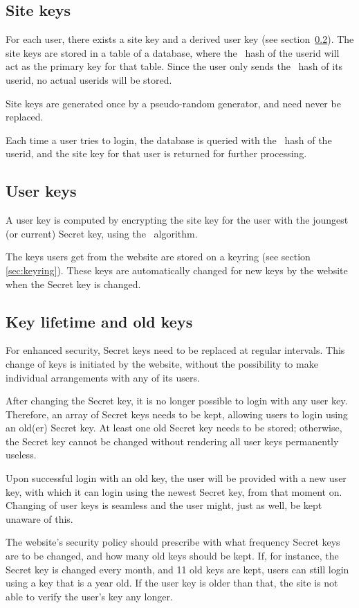 \subsection{Site keys}
For each user, there exists a site key and a derived user key (see section~\ref{sec:userkeys}).
The site keys are stored in a table of a database,
where the \SHA\ hash of the userid will act as the primary key for that table.
Since the user only sends the \SHA\ hash of its userid, no actual userids will be stored.
\par
Site keys are generated once by a pseudo-random generator, and need never be replaced.
\par
Each time a user tries to login,
the database is queried with the \SHA\ hash of the userid,
and the site key for that user is returned for further processing.

\subsection{User keys}
\label{sec:userkeys}
A user key is computed by encrypting the site key for the user with the joungest (or current) Secret key,
using the \AES\ algorithm.
\par
The keys users get from the website are stored on a keyring (see section \ref{sec:keyring}).
These keys are automatically changed for new keys by the website when the Secret key is changed.

\subsection{Key lifetime and old keys}
For enhanced security, Secret keys need to be replaced at regular intervals.
This change of keys is initiated by the website,
without the possibility to make individual arrangements with any of its users.
\par
After changing the Secret key, it is no longer possible to login with any user key.
Therefore, an array of Secret keys needs to be kept, allowing users to login using an old(er) Secret key.
At least one old Secret key needs to be stored; otherwise, the Secret key cannot be changed without rendering all user keys permanently useless.
\par
Upon successful login with an old key, the user will be provided with a new user key,
with which it can login using the newest Secret key, from that moment on.
Changing of user keys is seamless and the user might, just as well, be kept unaware of this.
\par
The website's security policy should prescribe with what frequency Secret keys are to be changed, and how many old keys should be kept.
If, for instance, the Secret key is changed every month, and 11 old keys are kept, users can still login using a key that is a year old.
If the user key is older than that, the site is not able to verify the user's key any longer.

